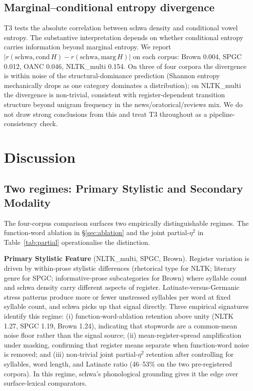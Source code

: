 \documentclass[11pt,a4paper]{article}
\begin{document}
\subsection{Marginal--conditional entropy divergence}

T3 tests the absolute correlation between schwa density and conditional
vowel entropy. The substantive interpretation depends on whether
conditional entropy carries information beyond marginal entropy. We
report \(\lvert r(\text{schwa}, \text{cond}\,H) - r(\text{schwa},
\text{marg}\,H) \rvert\) on each corpus: Brown 0.004, SPGC 0.012, OANC
0.046, NLTK\_multi 0.154. On three of four corpora the divergence is
within noise of the structural-dominance prediction (Shannon entropy
mechanically drops as one category dominates a distribution); on
NLTK\_multi the divergence is non-trivial, consistent with
register-dependent transition structure beyond unigram frequency in
the news/oratorical/reviews mix. We do not draw strong conclusions
from this and treat T3 throughout as a pipeline-consistency check.

\section{Discussion}

\subsection{Two regimes: Primary Stylistic and Secondary Modality}
\label{sec:regimes}

The four-corpus comparison surfaces two empirically distinguishable
regimes. The function-word ablation in §\ref{sec:ablation} and the
joint partial-\(\eta^2\) in Table~\ref{tab:partial} operationalise the
distinction.

\textbf{Primary Stylistic Feature} (NLTK\_multi, SPGC, Brown).
Register variation is driven by within-prose stylistic differences
(rhetorical type for NLTK; literary genre for SPGC; informative-prose
subcategories for Brown) where syllable count and schwa density carry
different aspects of register. Latinate-versus-Germanic stress patterns
produce more or fewer unstressed syllables per word at fixed syllable
count, and schwa picks up that signal directly. Three empirical
signatures identify this regime: (i) function-word-ablation retention
above unity (NLTK 1.27, SPGC 1.19, Brown 1.24), indicating that
stopwords are a common-mean noise floor rather than the signal source;
(ii) mean-register-spread amplification under masking, confirming that
register means separate when function-word noise is removed; and
(iii) non-trivial joint partial-\(\eta^2\) retention after controlling
for syllables, word length, and Latinate ratio (46--53\% on the two
pre-registered corpora). In this regime, schwa's phonological
grounding gives it the edge over surface-lexical comparators.
\end{document}
